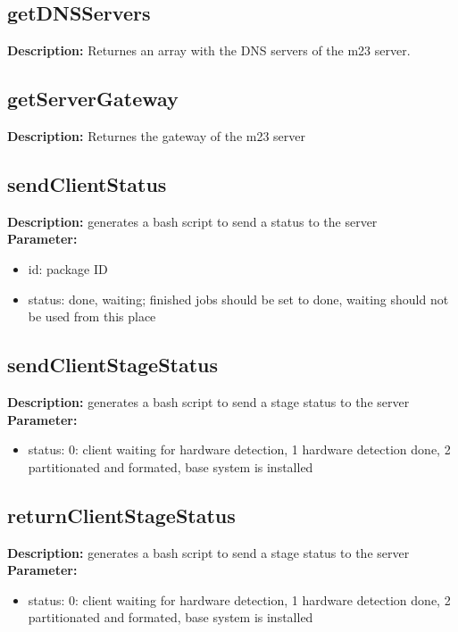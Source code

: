 \subsection{getDNSServers}
\textbf{Description:} Returnes an array with the DNS servers of the m23 server.\\

\subsection{getServerGateway}
\textbf{Description:} Returnes the gateway of the m23 server\\

\subsection{sendClientStatus}
\textbf{Description:} generates a bash script to send a status to the server\\
\textbf{Parameter:}
\begin{itemize}
\item id: package ID
\item status: done, waiting; finished jobs should be set to done, waiting should not be used from this place
\end{itemize}

\subsection{sendClientStageStatus}
\textbf{Description:} generates a bash script to send a stage status to the server\\
\textbf{Parameter:}
\begin{itemize}
\item status: 0: client waiting for hardware detection, 1 hardware detection done, 2 partitionated and formated, base system is installed
\end{itemize}

\subsection{returnClientStageStatus}
\textbf{Description:} generates a bash script to send a stage status to the server\\
\textbf{Parameter:}
\begin{itemize}
\item status: 0: client waiting for hardware detection, 1 hardware detection done, 2 partitionated and formated, base system is installed
\end{itemize}

